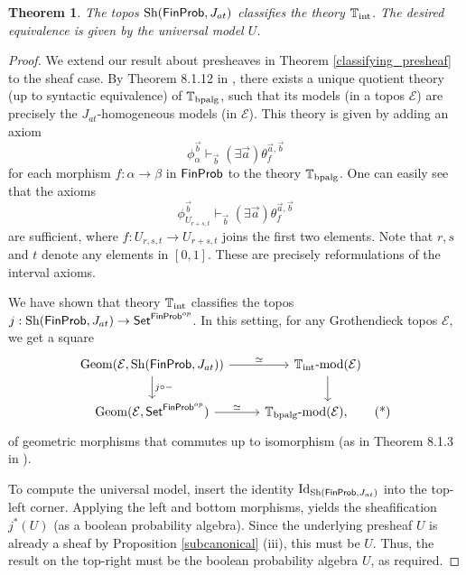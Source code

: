 \documentclass[a4paper]{amsproc}
\theoremstyle{plain}
\newtheorem{theorem}{Theorem}[section]
\theoremstyle{definition}
\theoremstyle{remark}
\numberwithin{equation}{section}
\DeclareMathOperator{\Sh}{Sh}
\DeclareMathOperator{\Geom}{Geom}
\newcommand{\Set}{\textup{\textsf{Set}}}
\newcommand{\FinProb}{\textup{\textsf{FinProb}}}
\begin{document}
\begin{theorem} \label{classifying}
    The topos $\Sh(\FinProb,J_{at})$ classifies the theory $\mathbb{T}_{\textup{int}}$. The desired equivalence is given by the universal model $U$.
\end{theorem}

\begin{proof}
    We extend our result about presheaves in Theorem \ref{classifying_presheaf} to the sheaf case. By Theorem 8.1.12 in \cite{caramello2018theories}, there exists a unique quotient theory (up to syntactic equivalence) of $\mathbb{T}_{\textup{bpalg}}$, such that its models (in a topos $\mathcal{E}$) are precisely the $J_{at}$-homogeneous models (in $\mathcal{E}$).
    This theory is given by adding an axiom
    \[
    \phi_{\alpha}^{\vec{b}} \vdash_{\vec{b}} (\exists \vec{a}) \theta_f^{\vec{a},\vec{b}}
    \]
    for each morphism $f: \alpha \to \beta$ in $\FinProb$ to the theory $\mathbb{T}_{\textup{bpalg}}$. One can easily see that the axioms
    \[
    \phi_{U_{r+s,t}}^{\vec{b}} \vdash_{\vec{b}} (\exists \vec{a}) \theta_f^{\vec{a},\vec{b}}
    \]
    are sufficient, where $f: U_{r,s,t} \to U_{r+s,t}$ joins the first two elements. Note that $r,s$ and $t$ denote any elements in $[0,1]$. These are precisely reformulations of the interval axioms.

    We have shown that theory $\mathbb{T}_{\textup{int}}$ classifies the topos $j: \Sh(\FinProb, J_{at}) \to \Set^{\FinProb^{op}}$. In this setting, for any Grothendieck topos $\mathcal{E}$, we get a square
    \begin{equation}\label{geometric_com}
        \begin{tikzcd}
            \Geom(\mathcal{E},\Sh(\FinProb,J_{at})) \arrow[d, "j \circ -"] \arrow[r, "\simeq"] & {\mathbb{T}_{\textup{int}}\textup{-mod}(\mathcal{E})} \arrow[d] \\
            \Geom(\mathcal{E},\Set^{\FinProb^{op}}) \arrow[r, "\simeq"]         & {\mathbb{T}_{\textup{bpalg}}\textup{-mod}(\mathcal{E})}, \tag{*}
        \end{tikzcd}
    \end{equation}
    of geometric morphisms that commutes up to isomorphism (as in Theorem 8.1.3 in \cite{caramello2018theories}). 
    
    To compute the universal model, insert the identity $\textup{Id}_{\Sh(\FinProb,J_{at})}$ into the top-left corner. Applying the left and bottom morphisms, yields the sheafification $j^*(U)$ (as a boolean probability algebra). Since the underlying presheaf $U$ is already a sheaf by Proposition \ref{subcanonical} (iii), this must be $U$. Thus, the result on the top-right must be the boolean probability algebra $U$, as required.
\end{proof}
\end{document}
